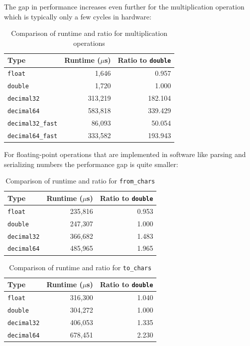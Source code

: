 \documentclass[acmsmall]{acmart}
\newcommand{\code}[1]{\texttt{#1}}
\begin{document}
The gap in performance increases even further for the multiplication operation which is typically only a few cycles in hardware\cite{arm_trm}:

\begin{table}[h]
\centering
\begin{tabular}{|l|r|r|}
\hline
Type & Runtime ($\mu$s) & Ratio to \texttt{double} \\
\hline
\texttt{float} & 1,646 & 0.957 \\
\texttt{double} & 1,720 & 1.000 \\
\texttt{decimal32} & 313,219 & 182.104 \\
\texttt{decimal64} & 583,818 & 339.429 \\
\texttt{decimal32\_fast} & 86,093 & 50.054 \\
\texttt{decimal64\_fast} & 333,582 & 193.943 \\
\hline
\end{tabular}
\caption{Comparison of runtime and ratio for multiplication operations}
\label{tab:mul-comparison}
\end{table}

For floating-point operations that are implemented in software like parsing and serializing numbers the performance gap is quite smaller:

\begin{table}[h]
\centering
\begin{tabular}{|l|r|r|}
\hline
Type & Runtime ($\mu$s) & Ratio to \texttt{double} \\
\hline
\texttt{float} & 235,816 & 0.953 \\
\texttt{double} & 247,307 & 1.000 \\
\texttt{decimal32} & 366,682 & 1.483 \\
\texttt{decimal64} & 485,965 & 1.965 \\
\hline
\end{tabular}
\caption{Comparison of runtime and ratio for \code{from\_chars}}
\label{tab:from-chars-comparison}
\end{table}

\begin{table}[h]
\centering
\begin{tabular}{|l|r|r|}
\hline
Type & Runtime ($\mu$s) & Ratio to \texttt{double} \\
\hline
\texttt{float} & 316,300 & 1.040 \\
\texttt{double} & 304,272 & 1.000 \\
\texttt{decimal32} & 406,053 & 1.335 \\
\texttt{decimal64} & 678,451 & 2.230 \\
\hline
\end{tabular}
\caption{Comparison of runtime and ratio for \code{to\_chars}}
\label{tab:runtime-comparison}
\end{table}
\end{document}
